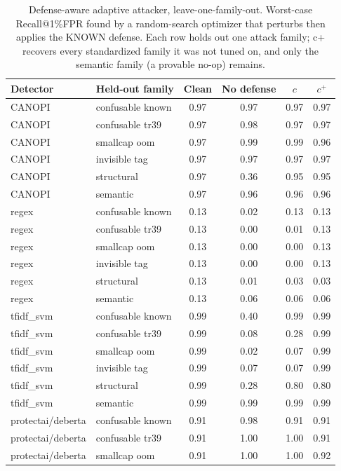 \begin{table}[ht]\centering
\caption{Defense-aware adaptive attacker, leave-one-family-out. Worst-case Recall@1\%FPR found by a random-search optimizer that perturbs then applies the KNOWN defense. Each row holds out one attack family; c+ recovers every standardized family it was not tuned on, and only the semantic family (a provable no-op) remains.}
\label{tab:adaptive_v2}
\small
\begin{tabular}{ll cccc}
\toprule
Detector & Held-out family & Clean & No defense & $c$ & $c^{+}$ \\
\midrule
CANOPI & confusable known & 0.97 & 0.97 & 0.97 & 0.97 \\
CANOPI & confusable tr39 & 0.97 & 0.98 & 0.97 & 0.97 \\
CANOPI & smallcap oom & 0.97 & 0.99 & 0.99 & 0.96 \\
CANOPI & invisible tag & 0.97 & 0.97 & 0.97 & 0.97 \\
CANOPI & structural & 0.97 & 0.36 & 0.95 & 0.95 \\
CANOPI & semantic & 0.97 & 0.96 & 0.96 & 0.96 \\
regex & confusable known & 0.13 & 0.02 & 0.13 & 0.13 \\
regex & confusable tr39 & 0.13 & 0.00 & 0.01 & 0.13 \\
regex & smallcap oom & 0.13 & 0.00 & 0.00 & 0.13 \\
regex & invisible tag & 0.13 & 0.00 & 0.00 & 0.13 \\
regex & structural & 0.13 & 0.01 & 0.03 & 0.03 \\
regex & semantic & 0.13 & 0.06 & 0.06 & 0.06 \\
tfidf_svm & confusable known & 0.99 & 0.40 & 0.99 & 0.99 \\
tfidf_svm & confusable tr39 & 0.99 & 0.08 & 0.28 & 0.99 \\
tfidf_svm & smallcap oom & 0.99 & 0.02 & 0.07 & 0.99 \\
tfidf_svm & invisible tag & 0.99 & 0.07 & 0.07 & 0.99 \\
tfidf_svm & structural & 0.99 & 0.28 & 0.80 & 0.80 \\
tfidf_svm & semantic & 0.99 & 0.99 & 0.99 & 0.99 \\
protectai/deberta & confusable known & 0.91 & 0.98 & 0.91 & 0.91 \\
protectai/deberta & confusable tr39 & 0.91 & 1.00 & 1.00 & 0.91 \\
protectai/deberta & smallcap oom & 0.91 & 1.00 & 1.00 & 0.92 \\

\end{tabular}
\end{table}
